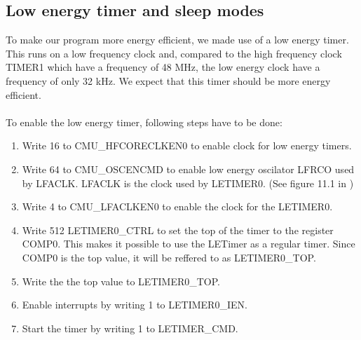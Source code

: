 \subsection{Low energy timer and sleep modes}

To make our program more energy efficient, we made use of a low energy timer. This runs on a low frequency clock and, compared to the high frequency clock TIMER1 which have a frequency of 48 MHz, the low energy clock have a frequency of only 32 kHz. We expect that this timer should be more energy efficient.\\
\\
To enable the low energy timer, following steps have to be done:

\begin{enumerate}
	\item {Write 16 to CMU\_HFCORECLKEN0 to enable clock for low energy timers.}
	\item {Write 64 to CMU\_OSCENCMD to enable low energy oscilator LFRCO used by LFACLK. LFACLK is the clock used by LETIMER0. (See figure 11.1 in \cite{reference_manual})}
	\item {Write 4 to CMU\_LFACLKEN0 to enable the clock for the LETIMER0.}
	\item {Write 512 LETIMER0\_CTRL to set the top of the timer to the register COMP0. This makes it possible to use the LETimer as a regular timer. Since COMP0 is the top value, it will be reffered to as LETIMER0\_TOP.}
	\item {Write the the top value to LETIMER0\_TOP.}
	\item {Enable interrupts by writing 1 to LETIMER0\_IEN.}
	\item {Start the timer by writing 1 to LETIMER\_CMD.} 
\end{enumerate}

